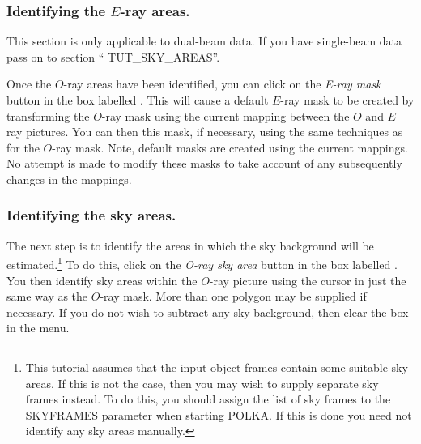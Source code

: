 \subsubsection {Identifying the $E$-ray areas.}
This section is only applicable to dual-beam data. If you have
single-beam data pass on to section ``
{TUT_SKY_AREAS}''.

Once the $O$-ray areas have been identified, you can click on the {\em
E-ray mask} button in the box labelled . This will cause a default $E$-ray mask to be
created by transforming the $O$-ray mask using the current mapping
between the $O$ and $E$ ray pictures. You can then
 this mask, if necessary, using the
same techniques as for the $O$-ray mask. Note, default masks are created
using the current mappings. No attempt is made to modify these masks to
take account of any subsequently changes in the mappings.

\subsubsection {Identifying the sky areas.}
The next step is to identify the areas in which the sky background will
be estimated.\footnote{This tutorial assumes that the input object frames
contain some suitable sky areas. If this is not the case, then you may
wish to supply separate sky frames instead. To do this, you should assign
the list of sky frames to the SKYFRAMES parameter when starting POLKA. If
this is done you need not identify any sky areas manually.} To do this,
click on the {\em O-ray sky area} button in the box labelled
. You then identify sky areas
within the $O$-ray picture using the cursor in just the same way as the
$O$-ray mask. More than one polygon may be supplied if necessary. If you
do not wish to subtract any sky background, then clear the
 box in the
 menu.


